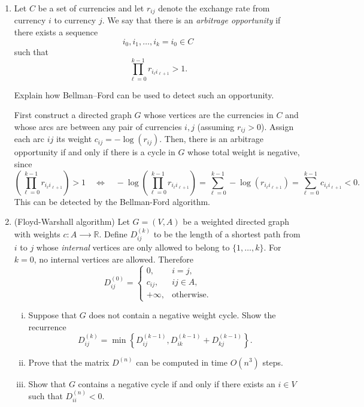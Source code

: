 \documentclass[11pt]{article}
\institute{\'Ecole Polytechnique F\'ed\'erale de Lausanne}
\begin{document}
\makeheader

\begin{enumerate}[1)]

\item \label{arbitrage} Let \(C\) be a set of currencies and let \(r_{ij}\) denote the exchange
rate from currency \(i\) to currency \(j\). We say that there is an
\emph{arbitrage opportunity} if there exists a sequence 
\[
i_0,i_1,\ldots,i_k=i_0 ∈ C
\]
such that
\[
\prod_{\ell=0}^{k-1} r_{i_\ell i_{\ell+1}}>1.
\]

 Explain how Bellman--Ford can be used
 to detect such an opportunity.

\begin{solution}
First construct a directed graph \(G\) whose vertices are the currencies in \(C\) and whose arcs are between any pair of currencies \(i,j\) (assuming \(r_{ij}>0\)). 
Assign each arc \(ij\) its weight \(c_{ij}=-\log(r_{ij})\). 
Then, there is an arbitrage opportunity if and only if there is a cycle in \(G\) whose total weight is negative,
since
\[
\left(\prod_{\ell=0}^{k-1} r_{i_\ell i_{\ell+1}}\right) > 1 \quad \Leftrightarrow \quad -\log\left(\prod_{\ell=0}^{k-1} r_{i_\ell i_{\ell+1}}\right) = \sum_{\ell=0}^{k-1} -\log(r_{i_\ell i_{\ell+1}}) = \sum_{\ell=0}^{k-1} c_{i_\ell i_{\ell+1}} < 0.
\]
This can be detected by the Bellman-Ford algorithm.
\end{solution}

\item \label{Floyd} (Floyd-Warshall algorithm) Let $G = (V,A)$ be a weighted directed graph with weights $c: A ⟶ ℝ$.
Define $D^{(k)}_{ij}$ to be the length of a shortest path from \(i\) to \(j\) whose \emph{internal}
vertices are only allowed to belong to $\{1,\dots,k\}$.
For \(k=0\), no internal vertices are allowed. Therefore
\[
D^{(0)}_{ij}
=
\begin{cases}
0, & i=j,\\
c_{ij}, & ij\in A,\\
+\infty, & \text{otherwise.}
\end{cases}
\]

\begin{enumerate}[i)] 
\item
 Suppose that $G$ does not contain a negative weight cycle. 
  Show the recurrence
  \[
    D^{(k)}_{ij}
    =
    \min\left\{
      D^{(k-1)}_{ij},
      D^{(k-1)}_{ik}+D^{(k-1)}_{kj}
    \right\}.
  \]
\item Prove that the matrix $D^{(n)}$ can be computed in time $O(n^3)$ steps.
\item  Show that $G$ contains a negative cycle if and only if there exists an $i ∈V$ such that $D^{(n)}_{ii} <0$. 
\end{enumerate}


\end{enumerate}
\end{document}
